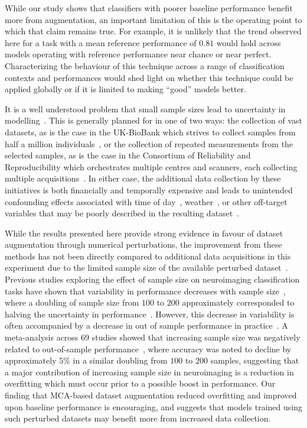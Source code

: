 \documentclass[10pt]{SelfArx} %
\begin{document}
While our study shows that classifiers with poorer baseline performance benefit more from augmentation, an important
limitation of this is the operating point to which that claim remains true. For example, it is unlikely that the trend
observed here for a task with a mean reference performance of $0.81$ would hold across models operating with reference
performance near chance or near perfect. Characterizing the behaviour of this technique across a range of
classification contexts and performances would shed light on whether this technique could be applied globally or if it
is limited to making ``good'' models better.

It is a well understood problem that small sample sizes lead to uncertainty in modelling~\cite{varoquaux2018cross}.
This is generally planned for in one of two ways: the collection of vast datasets, as is the case in the UK-BioBank
which strives to collect samples from half a million individuals~\cite{sudlow2015uk}, or the collection of repeated
measurements from the selected samples, as is the case in the Consortium of Reliability and Reproducibility which
orchestrates multiple centres and scanners, each collecting multiple acquisitions~\cite{zuo2014open}. In either case,
the additional data collection by these initiatives is both financially and temporally expensive and leads to
unintended confounding effects associated with time of day~\cite{vandewalle2009functional},
weather~\cite{di2019estimations}, or other off-target variables that may be poorly described in the resulting
dataset~\cite{chaddock2010neuroimaging}.

While the results presented here provide strong evidence in favour of dataset augmentation through numerical
perturbations, the improvement from these methods has not been directly compared to additional data acquisitions in
this experiment due to the limited sample size of the available perturbed dataset~\cite{Kiar2020-yz}. Previous studies
exploring the effect of sample size on neuroimaging classification tasks have shown that variability in performance
decreases with sample size~\cite{chu2012does}, where a doubling of sample size from $100$ to $200$
approximately corresponded to halving the uncertainty in performance~\cite{varoquaux2018cross}. However, this decrease
in variability is often accompanied by a decrease in out of sample performance in practice~\cite{schnack2016detecting}.
A meta-analysis across $69$ studies showed that increasing sample size was negatively related to out-of-sample
performance~\cite{pulini2019classification}, where accuracy was noted to decline by approximately $5\%$ in a similar
doubling from $100$ to $200$ samples, suggesting that a major contribution of increasing sample size in neuroimaging
is a reduction in overfitting which must occur prior to a possible boost in performance. Our finding that MCA-based
dataset augmentation reduced overfitting and improved upon baseline performance is encouraging, and suggests that
models trained using such perturbed datasets may benefit more from increased data collection.
\end{document}
